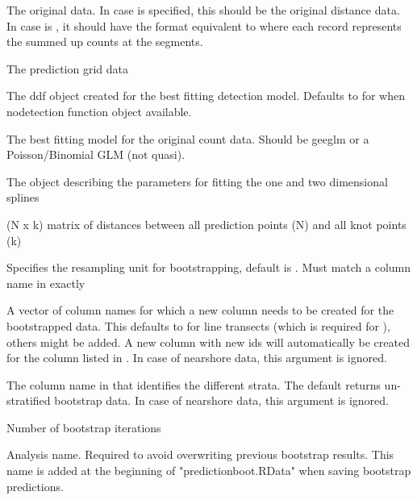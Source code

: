\documentclass[a4paper]{book}
\begin{document}
\begin{Arguments}
\begin{ldescription}
\item[\code{orig.data}] The original data. In case  is specified, this should be the original distance data. In case  is , it should have the format equivalent to  where each record represents the summed up counts at the segments.

\item[\code{predict.data}] The prediction grid data

\item[\code{ddf.obj}] The ddf object created for the best fitting detection model. Defaults to  for when nodetection function object available.

\item[\code{model.obj}] The best fitting  model for the original count data. Should be geeglm or a Poisson/Binomial GLM (not quasi).

\item[\code{splineParams}] The object describing the parameters for fitting the one and two dimensional splines

\item[\code{g2k}] (N x k) matrix of distances between all prediction points (N) and all knot points (k)

\item[\code{resample}] Specifies the resampling unit for bootstrapping, default is . Must match a column name in  exactly

\item[\code{rename}] A vector of column names for which a new column needs to be created for the bootstrapped data. This defaults to  for line transects (which is required for ), others might be added. 
A new column with new ids will automatically be created for the column listed in . In case of nearshore data, this argument is ignored.

\item[\code{stratum}] The column name in  that identifies the different strata. The default  returns un-stratified bootstrap data. In case of nearshore data, this argument is ignored.

\item[\code{B}] Number of bootstrap iterations

\item[\code{name}] Analysis name. Required to avoid overwriting previous bootstrap results. This name is added at the beginning of "predictionboot.RData" when saving bootstrap predictions.


\end{ldescription}
\end{Arguments}
\end{document}
